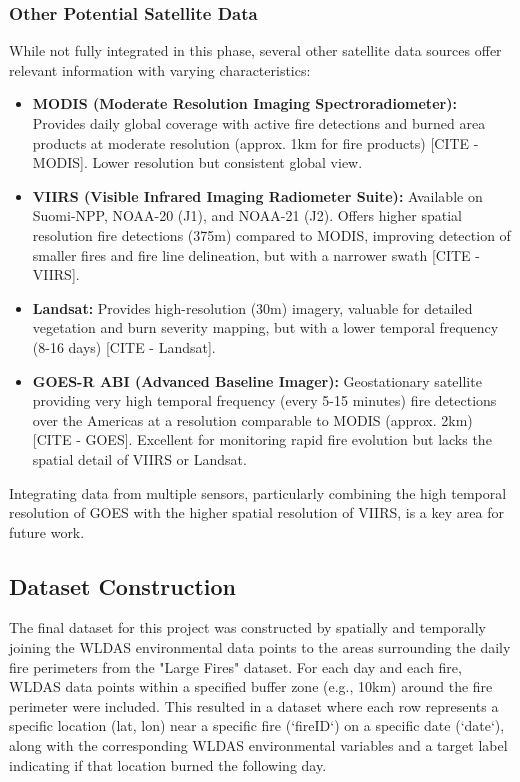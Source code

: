 \documentclass[conference]{IEEEtran}
\begin{document}
\subsubsection{Other Potential Satellite Data}
While not fully integrated in this phase, several other satellite data sources offer relevant information with varying characteristics:
\begin{itemize}
    \item \textbf{MODIS (Moderate Resolution Imaging Spectroradiometer):} Provides daily global coverage with active fire detections and burned area products at moderate resolution (approx. 1km for fire products) [CITE - MODIS]. Lower resolution but consistent global view.
    \item \textbf{VIIRS (Visible Infrared Imaging Radiometer Suite):} Available on Suomi-NPP, NOAA-20 (J1), and NOAA-21 (J2). Offers higher spatial resolution fire detections (375m) compared to MODIS, improving detection of smaller fires and fire line delineation, but with a narrower swath [CITE - VIIRS].
    \item \textbf{Landsat:} Provides high-resolution (30m) imagery, valuable for detailed vegetation and burn severity mapping, but with a lower temporal frequency (8-16 days) [CITE - Landsat].
    \item \textbf{GOES-R ABI (Advanced Baseline Imager):} Geostationary satellite providing very high temporal frequency (every 5-15 minutes) fire detections over the Americas at a resolution comparable to MODIS (approx. 2km) [CITE - GOES]. Excellent for monitoring rapid fire evolution but lacks the spatial detail of VIIRS or Landsat.
\end{itemize}
Integrating data from multiple sensors, particularly combining the high temporal resolution of GOES with the higher spatial resolution of VIIRS, is a key area for future work.

\subsection{Dataset Construction}
The final dataset for this project was constructed by spatially and temporally joining the WLDAS environmental data points to the areas surrounding the daily fire perimeters from the "Large Fires" dataset. For each day and each fire, WLDAS data points within a specified buffer zone (e.g., 10km) around the fire perimeter were included. This resulted in a dataset where each row represents a specific location (lat, lon) near a specific fire (`fireID`) on a specific date (`date`), along with the corresponding WLDAS environmental variables and a target label indicating if that location burned the following day.
\end{document}
